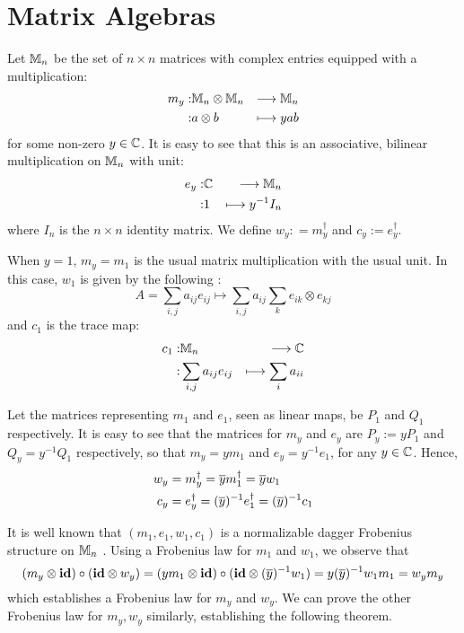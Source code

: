 
\section{Matrix Algebras}

Let $\mathbb{M}_n$ be the set of $n \times n$ matrices with complex entries equipped
with a multiplication:
\begin{eqnarray*}
  m_y :& \mathbb{M}_n \otimes \mathbb{M}_n &\longrightarrow     \mathbb{M}_n \\
      :&  a   \otimes b    &\longmapsto yab
\end{eqnarray*}
for some non-zero $y \in \mathbb{C}$. It is easy to see that this is an associative,
bilinear multiplication on $\mathbb{M}_n$ with unit:
\begin{eqnarray*}
  e_y :& \mathbb{C} &\longrightarrow     \mathbb{M}_n \\
    :&  1 &\longmapsto y^{-1}I_n
\end{eqnarray*}
where $I_n$ is the $n \times n$ identity matrix. We define
$w_y : = m_y^{\dagger}$ and $c _y := e_y^{\dagger}$.

When $y = 1$, $m_y = m_1$ is the usual matrix multiplication with the usual
unit. In this case, $w_1$ is given by the following \cite[8]{CatQChan}:
\[
  A = \sum_{i, j} a_{ij}e_{ij}
    \mapsto \sum_{i, j} a_{ij} \sum_{k} e_{ik} \otimes e_{kj}
\]
and $c_1$ is the trace map:
\begin{eqnarray*}
  c_1 :& \mathbb{M}_n &\longrightarrow     \mathbb{C} \\
      :& \sum_{i, j} a_{ij}e_{ij} &\longmapsto \sum_{i} a_{ii}
\end{eqnarray*}

Let the matrices representing $m_1$ and $e_1$, seen as linear maps, be $P_1$ and
$Q_1$ respectively. It is easy to see that the matrices for $m_y$ and $e_y$ are
$P_y := yP_1$ and $Q_y = y^{-1}Q_1$ respectively, so that $m_y = ym_1$ and
$e_y = y^{-1}e_1$, for any $y \in \mathbb{C}$. Hence,
\begin{align*}
  w_y &= m_y^{\dagger} = \overline{y}m_1^{\dagger} = \overline{y}w_1 \\
  c_y &= e_y^{\dagger} = (\overline{y})^{-1}e_1^{\dagger} = (\overline{y})^{-1}c_1
\end{align*}

It is well known that $(m_1, e_1, w_1, c_1)$ is a normalizable dagger Frobenius
structure on $\mathbb{M}_n$ \cite[8, 10]{CatQChan}. Using a Frobenius law for $m_1$
and $w_1$, we observe that
\[
  (m_y \otimes \textbf{id}) \circ (\textbf{id} \otimes w_y)
  = (ym_1 \otimes \textbf{id}) \circ (\textbf{id} \otimes (\overline{y})^{-1}w_1)
  = y(\overline{y})^{-1}w_1m_1
  = w_ym_y
\]
which establishes a Frobenius law for $m_y$ and $w_y$. We can prove the other
Frobenius law for $m_y, w_y$ similarly, establishing the following theorem.

